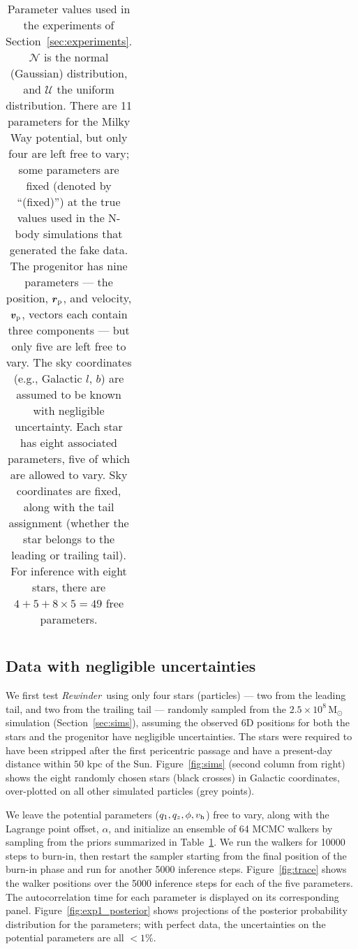 \documentclass[letterpaper,12pt,preprint]{aastex}
\newcommand{\msun}{\mathrm{M}_\odot}
\newcommand{\bs}{\boldsymbol}
\newcommand{\Loffset}{\alpha}
\newcommand{\vhalo}{v_{\rm h}}
\newcommand{\rewinder}{\emph{Rewinder}}
\begin{document}
\begin{table}[h]
\begin{center}
\begin{tabular}{l c c l}
		\bottomrule
		\end{tabular}
	\caption{Parameter values used in the experiments of Section~\ref{sec:experiments}. $\mathcal{N}$ is the normal (Gaussian) distribution, and $\mathcal{U}$ the uniform distribution. There are 11 parameters for the Milky Way potential, but only four are left free to vary; some parameters are fixed (denoted by ``(fixed)'') at the true values used in the N-body simulations that generated the fake data. The progenitor has nine parameters --- the position, $\bs{r}_{\rm p}$, and velocity, $\bs{v}_{\rm p}$, vectors each contain three components --- but only five are left free to vary. The sky coordinates (e.g., Galactic $l$, $b$) are assumed to be known with negligible uncertainty. Each star has eight associated parameters, five of which are allowed to vary. Sky coordinates are fixed, along with the tail assignment (whether the star belongs to the leading or trailing tail). For inference with eight stars, there are $4+5+8\times5=49$ free parameters. \label{tbl:params}}
\end{center}
\end{table}

\subsection{Data with negligible uncertainties}\label{sec:exp1}

We first test \rewinder\ using only four stars (particles) --- two from the leading tail, and two from the trailing tail --- randomly sampled from the $2.5\times10^8\,\msun$ simulation (Section~\ref{sec:sims}), assuming the observed 6D positions for both the stars and the progenitor have negligible uncertainties. The stars were required to have been stripped after the first pericentric passage and have a present-day distance within $50$ kpc of the Sun. Figure~\ref{fig:sims} (second column from right) shows the eight randomly chosen stars (black crosses) in Galactic coordinates, over-plotted on all other simulated particles (grey points). 

We leave the potential parameters ($q_1,q_z,\phi,\vhalo$) free to vary, along with the Lagrange point offset, $\Loffset$, and initialize an ensemble of 64 MCMC walkers by sampling from the priors summarized in Table~\ref{tbl:params}. We run the walkers for 10000 steps to burn-in, then restart the sampler starting from the final position of the burn-in phase and run for another 5000 inference steps. Figure~\ref{fig:trace} shows the walker positions over the 5000 inference steps for each of the five parameters. The autocorrelation time for each parameter is displayed on its corresponding panel. Figure~\ref{fig:exp1_posterior} shows projections of the posterior probability distribution for the parameters; with perfect data, the uncertainties on the potential parameters are all $<1\%$.
\end{document}
